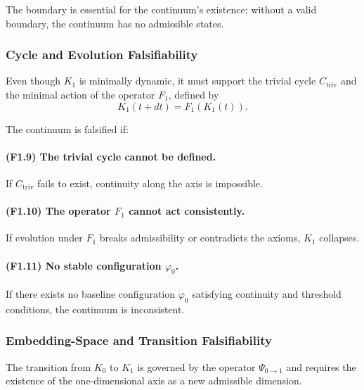 The boundary is essential for the continuum's existence; without a valid
boundary, the continuum has no admissible states.



\subsubsection{Cycle and Evolution Falsifiability}

Even though $K_1$ is minimally dynamic, it must support the trivial cycle
$C_{\mathrm{triv}}$ and the minimal action of the operator $F_1$,
defined by
\[
K_1(t+dt) = F_1(K_1(t)).
\]

The continuum is falsified if:

\paragraph{(F1.9) The trivial cycle cannot be defined.}
If $C_{\mathrm{triv}}$ fails to exist, continuity along the axis is
impossible.

\paragraph{(F1.10) The operator \texorpdfstring{$F_1$}{F_1} cannot act consistently.}
If evolution under $F_1$ breaks admissibility or contradicts the axioms,
$K_1$ collapses.

\paragraph{(F1.11) No stable configuration \texorpdfstring{$\varphi_0$}{\varphi_0}.}
If there exists no baseline configuration $\varphi_0$ satisfying
continuity and threshold conditions, the continuum is inconsistent.



\subsubsection{Embedding-Space and Transition Falsifiability}

The transition from $K_0$ to $K_1$ is governed by the operator
$\Psi_{0\to 1}$ and requires the existence of the one-dimensional axis as
a new admissible dimension.

